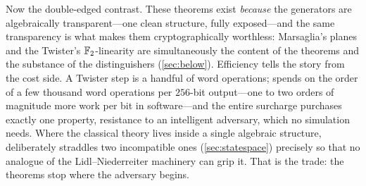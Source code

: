 Now the double-edged contrast. These theorems exist \emph{because} the
generators are algebraically transparent---one clean structure, fully
exposed---and the same transparency is what makes them cryptographically
worthless: Marsaglia's planes and the Twister's $\mathbb{F}_2$-linearity are
simultaneously the content of the theorems and the substance of the
distinguishers (\cref{sec:below}). Efficiency tells the story from the
cost side. A Twister step is a handful of word operations; \SHA{}
spends on the order of a few thousand word operations per $256$-bit
output---one to two orders of magnitude more work per bit in
software---and the entire surcharge purchases exactly one property,
resistance to an intelligent adversary, which no simulation needs.
Where the classical theory lives inside a single algebraic structure,
\SHA{} deliberately straddles two incompatible ones
(\cref{sec:statespace}) precisely so that no analogue of the
Lidl--Niederreiter machinery can grip it. That is the trade: the
theorems stop where the adversary begins.

